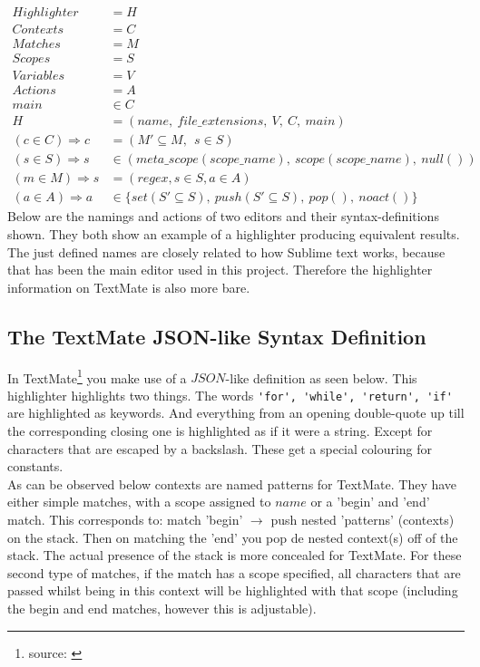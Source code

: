 	\begin{align} \label{eqn:highlighterDef}
	  \nonumber Highlighter &= H
	\\\nonumber Contexts   	&= C
	\\\nonumber Matches 	&= M
	\\\nonumber Scopes  	&= S
	\\\nonumber Variables  	&= V
	\\\nonumber Actions  	&= A
	\\\nonumber main &\in C
	\\\nonumber H &= (name,\ file\_extensions,\ V,\ C,\ main)
	\\\nonumber (c \in C) \Rightarrow c &= (M' \subseteq M,\ \ s \in S)
	\\\nonumber (s \in S) \Rightarrow s &\in (meta\_scope(scope\_name),\ scope(scope\_name),\ null())
	\\\nonumber (m \in M) \Rightarrow s &= (regex, s \in S, a \in A)
	\\\nonumber (a \in A) \Rightarrow a &\in \{set(S' \subseteq S),\ push(S' \subseteq S),\ pop(),\ noact()\}
	\end{align}
	Below are the namings and actions of two editors and their syntax-definitions shown. They both show an example of a highlighter producing equivalent results. The just defined names are closely related to how Sublime text works, because that has been the main editor used in this project. Therefore the highlighter information on TextMate is also more bare.


	\subsection{The TextMate JSON-like Syntax Definition}
	In TextMate\footnote{source: \cite{website:TextmateSyntax}} you make use of a $JSON$-like definition as seen below. This highlighter highlights two things. The words \verb|'for', 'while', 'return', 'if'| are highlighted as keywords. And everything from an opening double-quote up till the corresponding closing one is highlighted as if it were a string. Except for characters that are escaped by a backslash. These get a special colouring for constants.\\
	As can be observed below contexts are named patterns for TextMate. They have either simple matches, with a scope assigned to $name$ or a 'begin' and 'end' match. This corresponds to: match 'begin' $\rightarrow$ push nested 'patterns' (contexts) on the stack. Then on matching the 'end' you pop de nested context(s) off of the stack. The actual presence of the stack is more concealed for TextMate. For these second type of matches, if the match has a scope specified, all characters that are passed whilst being in this context will be highlighted with that scope (including the begin and end matches, however this is adjustable).
